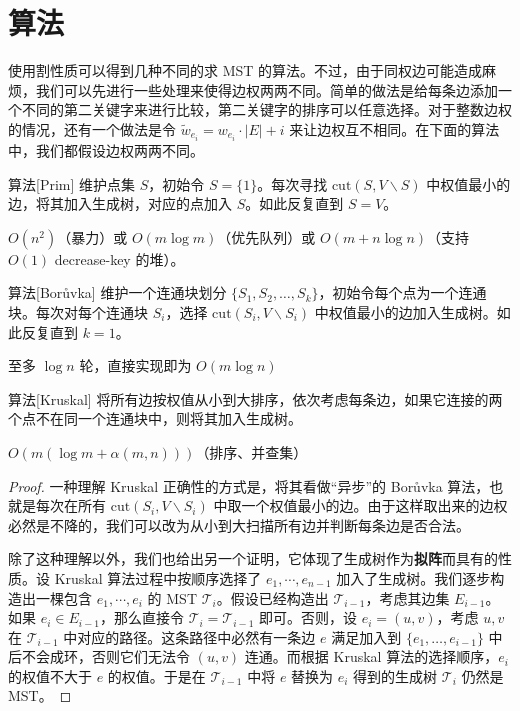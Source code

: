 \section{算法}

使用割性质可以得到几种不同的求 MST 的算法。不过，由于同权边可能造成麻烦，我们可以先进行一些处理来使得边权两两不同。简单的做法是给每条边添加一个不同的第二关键字来进行比较，第二关键字的排序可以任意选择。对于整数边权的情况，还有一个做法是令 $\tilde w_{e_i}=w_{e_i}\cdot |E|+i$ 来让边权互不相同。在下面的算法中，我们都假设边权两两不同。

\begin{descbox}{算法}[Prim]
    维护点集 $S$，初始令 $S=\{1\}$。每次寻找 $\mathrm{cut}(S,V\backslash S)$ 中权值最小的边，将其加入生成树，对应的点加入 $S$。如此反复直到 $S=V$。

    $O(n^2)$（暴力）或 $O(m\log m)$（优先队列）或 $O(m+n\log n)$（支持 $O(1)$ decrease-key 的堆）。
\end{descbox}

\begin{descbox}{算法}[Borůvka]
    维护一个连通块划分 $\{S_1,S_2,\ldots,S_k\}$，初始令每个点为一个连通块。每次对每个连通块 $S_i$，选择 $\mathrm{cut}(S_i,V\backslash S_i)$ 中权值最小的边加入生成树。如此反复直到 $k=1$。

    至多 $\log n$ 轮，直接实现即为 $O(m\log n)$
\end{descbox}


\begin{descbox}{算法}[Kruskal]
    将所有边按权值从小到大排序，依次考虑每条边，如果它连接的两个点不在同一个连通块中，则将其加入生成树。
       
    $O(m(\log m+\alpha(m,n)))$（排序、并查集）
\end{descbox}
\begin{proof}
    一种理解 Kruskal 正确性的方式是，将其看做“异步”的 Borůvka 算法，也就是每次在所有 $\mathrm{cut}(S_i,V\backslash S_i)$ 中取一个权值最小的边。由于这样取出来的边权必然是不降的，我们可以改为从小到大扫描所有边并判断每条边是否合法。
    
    
    除了这种理解以外，我们也给出另一个证明，它体现了生成树作为\textbf{拟阵}而具有的性质。设 Kruskal 算法过程中按顺序选择了 $e_1,\cdots,e_{n-1}$ 加入了生成树。我们逐步构造出一棵包含 $e_1,\cdots,e_i$ 的 MST $\mathcal T_i$。假设已经构造出 $\mathcal T_{i-1}$，考虑其边集 $E_{i-1}$。如果 $e_i\in E_{i-1}$，那么直接令 $\mathcal T_i=\mathcal T_{i-1}$ 即可。否则，设 $e_i=(u,v)$，考虑 $u,v$ 在 $\mathcal T_{i-1}$ 中对应的路径。这条路径中必然有一条边 $e$ 满足加入到 $\{e_1,\ldots,e_{i-1}\}$ 中后不会成环，否则它们无法令 $(u,v)$ 连通。而根据 Kruskal 算法的选择顺序，$e_i$ 的权值不大于 $e$ 的权值。于是在 $\mathcal T_{i-1}$ 中将 $e$ 替换为 $e_i$ 得到的生成树 $\mathcal T_i$ 仍然是 MST。
\end{proof}


